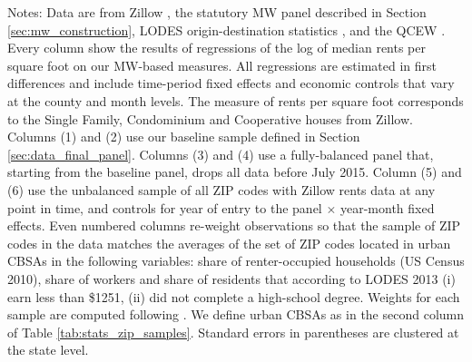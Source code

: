 \begin{landscape}
\begin{table}[hbt!]
    \begin{minipage}{.95\linewidth} \footnotesize
        \vspace{2mm}
        Notes:
        Data are from Zillow \parencite{ZillowData}, 
        the statutory MW panel described in Section \ref{sec:mw_construction}, 
        LODES origin-destination statistics \parencite{CensusLODES},
        and the QCEW \parencite{QCEW}.
        Every column show the results of regressions of the log of 
        median rents per square foot on our MW-based measures.
        All regressions are estimated in first differences and include 
        time-period fixed effects and economic controls that vary at the 
        county and month levels.
        The measure of rents per square foot corresponds to the Single Family, 
        Condominium and Cooperative houses from Zillow.
        Columns (1) and (2) use our baseline sample defined in Section 
        \ref{sec:data_final_panel}.
        Columns (3) and (4) use a fully-balanced panel that, starting from the 
        baseline panel, drops all data before July 2015.
        Column (5) and (6) use the unbalanced sample of all ZIP codes with 
        Zillow rents data at any point in time, and controls for year of entry 
        to the panel $\times$ year-month fixed effects.
        Even numbered columns re-weight observations so that the sample of 
        ZIP codes in the data matches the averages of the set of ZIP codes
        located in urban CBSAs in the following variables:
        share of renter-occupied households (US Census 2010),
        share of workers and share of residents that according to LODES 2013 
        (i) earn less than \$1251, (ii) did not complete a high-school degree. 
        Weights for each sample are computed following \textcite{Hainmueller2012}.
        We define urban CBSAs as in the second column of Table 
        \ref{tab:stats_zip_samples}.
        Standard errors in parentheses are clustered at the state level.
    \end{minipage}
\end{table}
\end{landscape}
